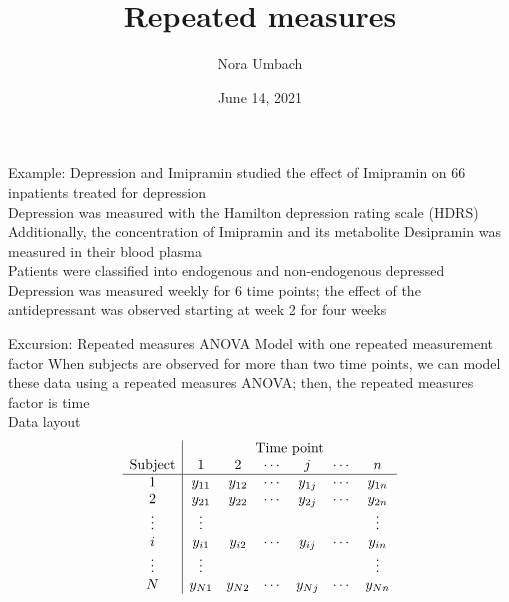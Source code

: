 \documentclass{beamer}
\title{Repeated measures}
\author{Nora Umbach%
}
\date{June 14, 2021}
\begin{document}
\begin{frame}{}
\thispagestyle{empty}
\titlepage
\end{frame}



\begin{frame}{Example: Depression and Imipramin}
  \citet{ReisbyGram77} studied the effect of Imipramin on 66 inpatients
  treated for depression \\[2ex]

  Depression was measured with the Hamilton depression rating scale
  (HDRS)\\[2ex]

  Additionally, the concentration of Imipramin and its metabolite
  Desipramin was measured in their blood plasma\\[2ex]
 
  Patients were classified into endogenous and non-endogenous depressed\\[2ex]

  Depression was measured weekly for 6 time points; the effect of the
  antidepressant was observed starting at week 2 for four weeks
\end{frame}


\begin{frame}{Excursion: Repeated measures ANOVA}
  {Model with one repeated measurement factor}
  When subjects are observed for more than two time points, we can model
  these data using a repeated measures ANOVA; then, the repeated measures
  factor is time\\[2ex]

  Data layout
\[ \begin{array}{c|cccccc}
              & \multicolumn{6}{c}{\text{Time point}} \\
\text{Subject} & 1 & 2 & \cdots & j & \cdots & n \\ \hline
1      & y_{11} & y_{12} & \cdots & y_{1j} & \cdots & y_{1n} \\
2      & y_{21} & y_{22} & \cdots & y_{2j} & \cdots & y_{2n} \\
\vdots & \vdots &        &        &        &        & \vdots \\
i      & y_{i1} & y_{i2} & \cdots & y_{ij} & \cdots & y_{in} \\
\vdots & \vdots &        &        &        &        & \vdots \\
N      & y_{N1} & y_{N2} & \cdots & y_{Nj} & \cdots & y_{Nn} \\
\end{array} \]
\end{frame}
\end{document}
